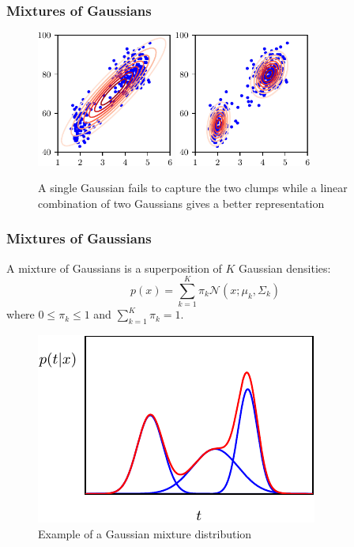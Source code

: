 \documentclass{beamer}
\begin{document}
\begin{frame}
    \frametitle{Mixtures of Gaussians}
    \begin{figure}
        \caption{A single Gaussian fails to capture the two clumps while a linear combination of two Gaussians gives a better representation}
        \includegraphics[width=0.4\textwidth]{Figure_6_a.pdf}
        \includegraphics[width=0.4\textwidth]{Figure_6_b.pdf}
    \end{figure}
\end{frame}

\begin{frame}
    \frametitle{Mixtures of Gaussians}
    A mixture of Gaussians is a superposition of $K$ Gaussian densities:
    \begin{equation*}
        p(x)=\sum_{k=1}^{K}\pi_{k}\mathcal{N}(x;\mu_{k},\Sigma_{k})
    \end{equation*}
    where $0\le\pi_{k}\le{}1$ and $\sum_{k=1}^{K}\pi_{k}=1$.
    \begin{figure}
        \caption{Example of a Gaussian mixture distribution}
        \includegraphics{Figure_7.pdf}
    \end{figure}
\end{frame}
\end{document}
